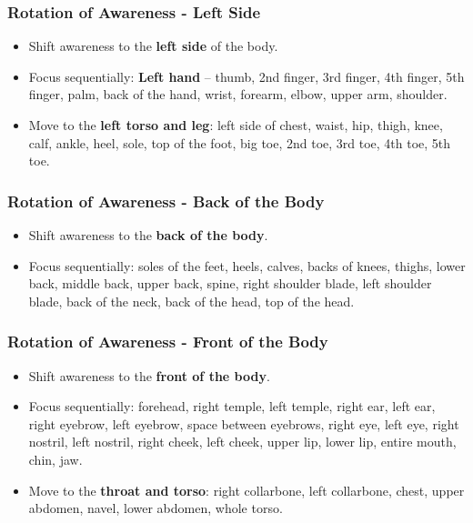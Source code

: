 \begin{frame}[fragile]\frametitle{Rotation of Awareness - Left Side}
    \begin{itemize}
        \item Shift awareness to the \textbf{left side} of the body.
        \item Focus sequentially: \textbf{Left hand} -- thumb, 2nd finger, 3rd finger, 4th finger, 5th finger, palm, back of the hand, wrist, forearm, elbow, upper arm, shoulder.
        \item Move to the \textbf{left torso and leg}: left side of chest, waist, hip, thigh, knee, calf, ankle, heel, sole, top of the foot, big toe, 2nd toe, 3rd toe, 4th toe, 5th toe.
    \end{itemize}
\end{frame}

\begin{frame}[fragile]\frametitle{Rotation of Awareness - Back of the Body}
    \begin{itemize}
        \item Shift awareness to the \textbf{back of the body}.
        \item Focus sequentially: soles of the feet, heels, calves, backs of knees, thighs, lower back, middle back, upper back, spine, right shoulder blade, left shoulder blade, back of the neck, back of the head, top of the head.
    \end{itemize}
\end{frame}

\begin{frame}[fragile]\frametitle{Rotation of Awareness - Front of the Body}
    \begin{itemize}
        \item Shift awareness to the \textbf{front of the body}.
        \item Focus sequentially: forehead, right temple, left temple, right ear, left ear, right eyebrow, left eyebrow, space between eyebrows, right eye, left eye, right nostril, left nostril, right cheek, left cheek, upper lip, lower lip, entire mouth, chin, jaw.
        \item Move to the \textbf{throat and torso}: right collarbone, left collarbone, chest, upper abdomen, navel, lower abdomen, whole torso.
    \end{itemize}
\end{frame}

